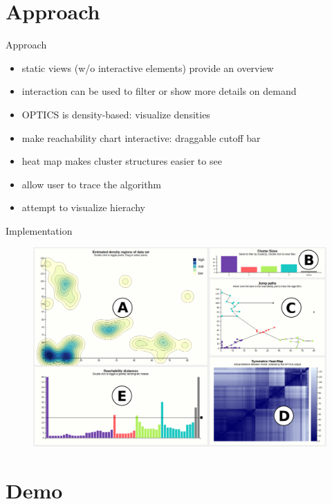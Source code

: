 \documentclass[naustrian]{beamer}
\begin{document}
{


\section{Approach}

\begin{frame}{Approach}
    \begin{itemize}
        \item static views (w/o interactive elements) provide an overview
        \item interaction can be used to filter or show more details on demand
        \item OPTICS is density-based: visualize densities
        \item make reachability chart interactive: draggable cutoff bar
        \item heat map makes cluster structures easier to see
        \item allow user to trace the algorithm
        \item attempt to visualize hierachy
    \end{itemize}
\end{frame}

\begin{frame}{Implementation}
    \begin{figure}[H]
        \centering
        \includegraphics[height=0.85\textheight]{img/opticsvis-overview}
    \end{figure}
\end{frame}

\section{Demo}
}
\end{document}
